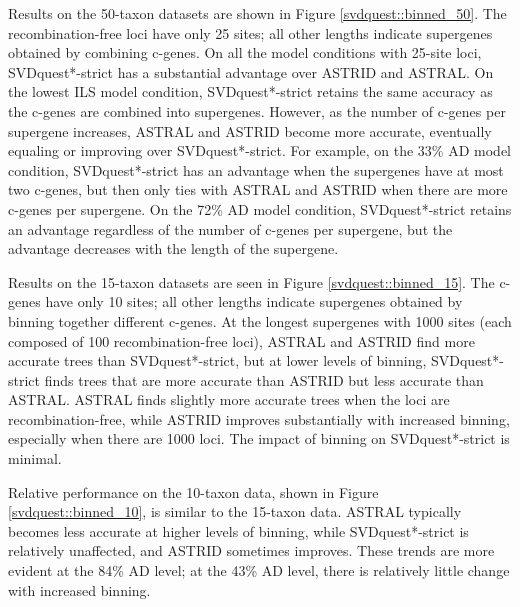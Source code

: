 Results on the 50-taxon datasets are shown 
in Figure \ref{svdquest::binned_50}. 
The recombination-free loci have only 25 sites; all other
lengths indicate supergenes obtained by combining c-genes.
On all the model
conditions with 25-site loci,
SVDquest*-strict has a substantial advantage over ASTRID and ASTRAL. 
On the
lowest ILS model condition, SVDquest*-strict retains the same accuracy as the
c-genes are combined into supergenes. 
However, as the number of c-genes per supergene increases, ASTRAL and ASTRID become
more accurate,  eventually equaling or improving over SVDquest*-strict. 
For example, on the 33\% AD  model condition, SVDquest*-strict has an
advantage when the supergenes have at most two c-genes, but  then only
ties with ASTRAL and ASTRID when there are 
more c-genes per supergene.  
On the 72\% AD 
model condition, SVDquest*-strict retains an advantage regardless of the
number of c-genes per supergene, but the advantage decreases with the length
of the supergene. 

Results on the 15-taxon datasets are seen in Figure \ref{svdquest::binned_15}.
The c-genes have only 10 sites; all other lengths
indicate supergenes obtained by binning together different c-genes.
At the longest supergenes with 1000 sites (each composed of
100 recombination-free loci), ASTRAL and ASTRID find more accurate
trees than SVDquest*-strict, but at lower levels of binning, SVDquest*-strict finds
trees that are more accurate than ASTRID but less accurate than
ASTRAL. ASTRAL finds slightly more accurate trees when the loci are
recombination-free, while ASTRID improves substantially with increased
binning, especially when there are 1000 loci.  The impact of binning
on SVDquest*-strict is minimal.

Relative performance on the 10-taxon data, shown
in Figure \ref{svdquest::binned_10}, is similar to the
15-taxon data. ASTRAL typically becomes less accurate at higher levels
of binning, while SVDquest*-strict is  relatively unaffected, and ASTRID
sometimes improves. These trends are more evident at the 84\% AD
level; at the 43\% AD level, there is relatively little change with
increased binning.

